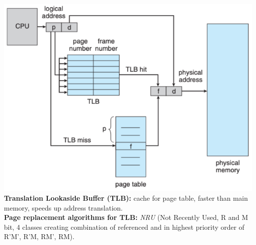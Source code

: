 \includegraphics[width=\linewidth]{figs/mmu-with-tlb.png}\\
\textbf{Translation Lookaside Buffer (TLB):} cache for page table, faster than main memory, speeds up address translation.\\
\textbf{Page replacement algorithms for TLB:} \textit{NRU} (Not Recently Used, R and M bit, 4 classes creating combination of referenced and in highest priority order of R'M', R'M, RM', RM).\\
